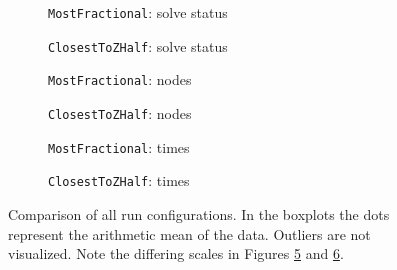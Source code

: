 \begin{figure}
	\centering

	\begin{subfigure}{0.495\textwidth}
		\centering
		
		\caption{\texttt{MostFractional}: solve status}
		\label{fig:mostfractional_solve_status}
	\end{subfigure}
	\hfill
	\begin{subfigure}{0.495\textwidth}
		\centering
		
		\caption{\texttt{ClosestToZHalf}: solve status}
		\label{fig:closesttozhalf_solve_status}
	\end{subfigure}

	\vspace{1em}

	\begin{subfigure}{0.495\textwidth}
		\centering
		
		\caption{\texttt{MostFractional}: nodes}
		\label{fig:mostfractional_nodes}
	\end{subfigure}
	\hfill
	\begin{subfigure}{0.495\textwidth}
		\centering
		
		\caption{\texttt{ClosestToZHalf}: nodes}
		\label{fig:closesttozhalf_nodes}
	\end{subfigure}

	\vspace{1em}

	\begin{subfigure}{0.495\textwidth}
		\centering
		
		\caption{\texttt{MostFractional}: times}
		\label{fig:mostfractional_times}
	\end{subfigure}
	\hfill
	\begin{subfigure}{0.495\textwidth}
		\centering
		
		\caption{\texttt{ClosestToZHalf}: times}
		\label{fig:closesttozhalf_times}
	\end{subfigure}

	\caption{Comparison of all run configurations. In the boxplots the dots represent the arithmetic mean of the data. Outliers are not visualized. Note the differing scales in Figures \ref{fig:mostfractional_times} and \ref{fig:closesttozhalf_times}.}
	\label{fig:comparison_general}
\end{figure}

